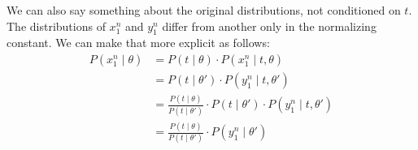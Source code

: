 \documentclass[a4paper,10pt,landscape,twocolumn]{scrartcl}
\begin{document}
	We can also say something about the original distributions, not conditioned on $t$. The distributions of $x_1^n$ and $y_1^n$ differ from another only in the normalizing constant. We can make that more explicit as follows:
	\begin{align}
	P(x_1^n \mid \theta) 
		&= P(t \mid \theta) \cdot P(x_1^n \mid t, \theta)\\
		&= P(t \mid \theta') \cdot P(y_1^n \mid t, \theta') \\
		&=\frac{P(t \mid \theta)}{P(t \mid \theta')} \cdot P(t \mid \theta') \cdot P(y_1^n \mid t, \theta')\\
		&= \frac{P(t \mid \theta)}{P(t \mid \theta')} \cdot  P(y_1^n \mid \theta')
	\end{align}
	
	
	
\end{document}
